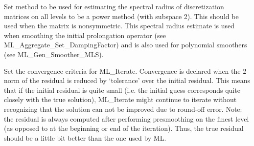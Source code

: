 

\vspace{2em}
{ \hrulefill}
\vspace{1em}

Set method to be used for estimating the spectral 
radius of discretization matrices on all levels
to be a power method (with subspace 2).
This should be used when the matrix is nonsymmetric.
This spectral radius estimate is used when smoothing
the initial prolongation operator  (see ML\_Aggregate\_Set\_DampingFactor)
and is also used for polynomial smoothers
(see ML\_Gen\_Smoother\_MLS).

\vspace{2em}
{ \hrulefill}
\vspace{1em}




\vspace{2em}
{ \hrulefill}
\vspace{1em}

Set the convergence criteria for ML\_Iterate. Convergence is declared when the 2-norm
of the residual is reduced by `tolerance' over the initial residual. This means that
if the initial residual is quite small (i.e. the initial guess corresponds quite
closely with the true solution), ML\_Iterate might continue to iterate without
recognizing that the solution can not be improved due to round-off error.
Note: the residual is always computed after performing presmoothing on the finest level
(as opposed to at the beginning or end of the iteration). Thus, the true residual should be a
little bit better than the one used by ML.

\vspace{2em}
{ \hrulefill}
\vspace{1em}

